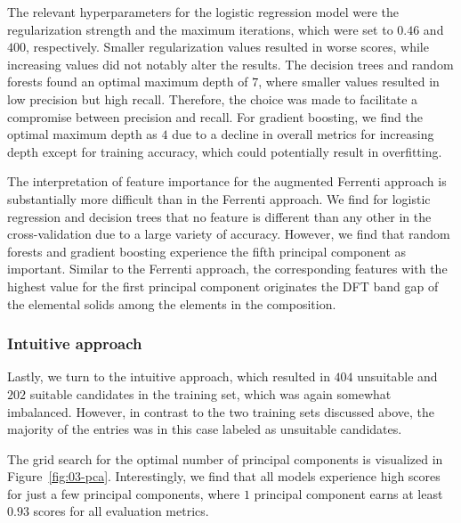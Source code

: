 \documentclass[superscriptaddress,unsortedaddress,
 amsmath,amssymb,
 aps,
]{revtex4-2}
\begin{document}
The relevant hyperparameters for the logistic regression model were the regularization strength and the maximum iterations, which were set to $0.46$ and $400$, respectively. Smaller regularization values resulted in worse scores, while increasing values did not notably alter the results. The decision trees and random forests found an optimal maximum depth of $7$, where smaller values resulted in low precision but high recall. Therefore, the choice was made to facilitate a compromise between precision and recall. For gradient boosting, we find the optimal maximum depth as $4$ due to a decline in overall metrics for increasing depth except for training accuracy, which could potentially result in overfitting.


The interpretation of feature importance for the augmented Ferrenti approach is substantially more difficult than in the Ferrenti approach. We find for logistic regression and decision trees that no feature is different than any other in the cross-validation due to a large variety of accuracy. However, we find that random forests and gradient boosting experience the fifth principal component as important. Similar to the Ferrenti approach, the corresponding features with the highest value for the first principal component originates the DFT band gap of the elemental solids among the elements in the composition.

\subsubsection*{Intuitive approach}

Lastly, we turn to the intuitive approach, which resulted in $404$ unsuitable and $202$ suitable candidates in the training set, which was again somewhat imbalanced. However, in contrast to the two training sets discussed above, the majority of the entries was in this case labeled as unsuitable candidates. 

The grid search for the optimal number of principal components is visualized in Figure~\ref{fig:03-pca}. Interestingly, we find that all models experience high scores for just a few principal components, where $1$ principal component earns at least $0.93$ scores for all evaluation metrics. %
\end{document}
